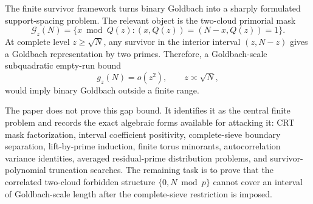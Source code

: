 \documentclass[11pt]{article}
\theoremstyle{plain}
\theoremstyle{definition}
\theoremstyle{remark}
\newcommand{\G}{\mathcal G}
\begin{document}
The finite survivor framework turns binary Goldbach into a sharply formulated
support-spacing problem.  The relevant object is the two-cloud primorial mask
\[
\G_z(N)=\{x\bmod Q(z):(x,Q(z))=(N-x,Q(z))=1\}.
\]
At complete level \(z\ge\sqrt N\), any survivor in the interior interval
\((z,N-z)\) gives a Goldbach representation by two primes.  Therefore, a
Goldbach-scale subquadratic empty-run bound
\[
g_z(N)=o(z^2),
\qquad z\asymp\sqrt N,
\]
would imply binary Goldbach outside a finite range.

The paper does not prove this gap bound.  It identifies it as the central finite
problem and records the exact algebraic forms available for attacking it: CRT
mask factorization, interval coefficient positivity, complete-sieve boundary
separation, lift-by-prime induction, finite torus minorants, autocorrelation
variance identities, averaged residual-prime distribution problems, and
survivor-polynomial truncation searches.  The remaining task is to prove that
the correlated two-cloud forbidden structure \(\{0,N\bmod p\}\) cannot cover an
interval of Goldbach-scale length after the complete-sieve restriction is
imposed.
\end{document}
